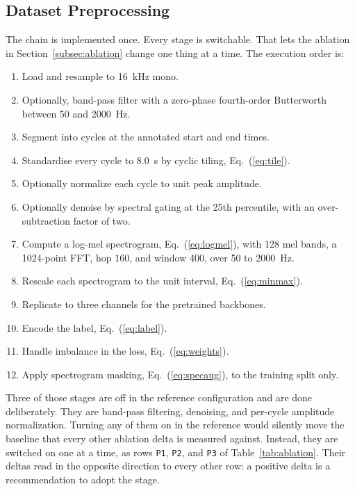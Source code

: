 \documentclass[journal,onecolumn]{IEEEtran}
\begin{document}
\subsection{Dataset Preprocessing}
\label{subsec:preprocessing}

The chain is implemented once. Every stage is switchable. That lets the ablation in
Section~\ref{subsec:ablation} change one thing at a time. The execution order is:

\begin{enumerate}
\item Load and resample to 16~kHz mono.
\item Optionally, band-pass filter with a zero-phase fourth-order Butterworth between
50 and 2000~Hz.
\item Segment into cycles at the annotated start and end times.
\item Standardise every cycle to 8.0~s by cyclic tiling, Eq.~(\ref{eq:tile}).
\item Optionally normalize each cycle to unit peak amplitude.
\item Optionally denoise by spectral gating at the 25th percentile, with an
over-subtraction factor of two.
\item Compute a log-mel spectrogram, Eq.~(\ref{eq:logmel}), with 128 mel bands, a
1024-point FFT, hop 160, and window 400, over 50 to 2000~Hz.
\item Rescale each spectrogram to the unit interval, Eq.~(\ref{eq:minmax}).
\item Replicate to three channels for the pretrained backbones.
\item Encode the label, Eq.~(\ref{eq:label}).
\item Handle imbalance in the loss, Eq.~(\ref{eq:weights}).
\item Apply spectrogram masking, Eq.~(\ref{eq:specaug}), to the training split only.
\end{enumerate}

Three of those stages are off in the reference configuration and are done
deliberately. They are band-pass filtering, denoising, and per-cycle amplitude
normalization. Turning any of them on in the reference would silently move the
baseline that every other ablation delta is measured against. Instead, they are
switched on one at a time, as rows \texttt{P1}, \texttt{P2}, and \texttt{P3} of
Table~\ref{tab:ablation}. Their deltas read in the opposite direction to
every other row: a positive delta is a recommendation to adopt the stage.
\end{document}
